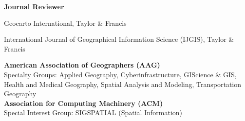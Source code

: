 \documentclass{acmcv}
\begin{document}
    \textbf{Journal Reviewer}
    \begin{titemize}
        \item Geocarto International, Taylor \& Francis
        \item International Journal of Geographical Information Science (IJGIS), Taylor \& Francis
    \end{titemize}



    \vspace*{0.5cm}
\vspace*{.3cm}

    \textbf{American Association of Geographers (AAG)} \\
    Specialty Groups: Applied Geography, Cyberinfrastructure, GIScience \& GIS, Health and Medical Geography, Spatial Analysis and Modeling, Transportation Geography \\

    \textbf{Association for Computing Machinery (ACM)} \\
    Special Interest Group:  SIGSPATIAL (Spatial Information)

	
		
		
		
\end{document}

